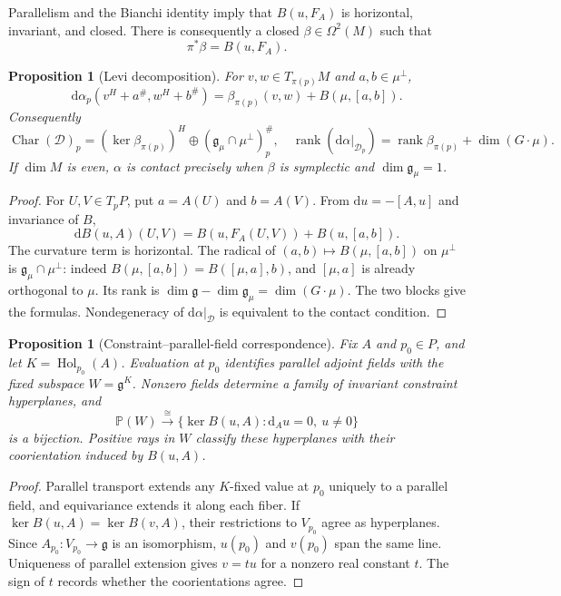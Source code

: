 \documentclass[11pt]{amsart}
\newcommand{\g}{\mathfrak g}
\newcommand{\Hol}{\operatorname{Hol}}
\newcommand{\Char}{\operatorname{Char}}
\newcommand{\rank}{\operatorname{rank}}
\newcommand{\dd}{\mathrm d}
\theoremstyle{plain}
\newtheorem{proposition}[theorem]{Proposition}
\theoremstyle{definition}
\theoremstyle{remark}
\begin{document}
Parallelism and the Bianchi identity imply that $B(u,F_A)$ is horizontal, invariant, and closed.  There is consequently a closed $\beta\in\Omega^2(M)$ such that
\begin{equation}\label{eq:beta}
 \pi^*\beta=B(u,F_A).
\end{equation}

\begin{proposition}[Levi decomposition]\label{prop:levi}
For $v,w\in T_{\pi(p)}M$ and $a,b\in\mu^\perp$,
\begin{equation}\label{eq:levi}
 \dd\alpha_p(v^H+a^\#,w^H+b^\#)
 =\beta_{\pi(p)}(v,w)+B(\mu,[a,b]).
\end{equation}
Consequently
\[
 \Char(\mathcal D)_p=(\ker\beta_{\pi(p)})^H
 \oplus(\g_\mu\cap\mu^\perp)^\#_p,
 \quad
 \rank(\dd\alpha|_{\mathcal D_p})
 =\rank\beta_{\pi(p)}+\dim(G\cdot\mu).
\]
If $\dim M$ is even, $\alpha$ is contact precisely when $\beta$ is symplectic and $\dim\g_\mu=1$.
\end{proposition}

\begin{proof}
For $U,V\in T_pP$, put $a=A(U)$ and $b=A(V)$.  From $\dd u=-[A,u]$ and invariance of $B$,
\[
 \dd B(u,A)(U,V)=B(u,F_A(U,V))+B(u,[a,b]).
\]
The curvature term is horizontal.  The radical of $(a,b)\mapsto B(\mu,[a,b])$ on $\mu^\perp$ is $\g_\mu\cap\mu^\perp$: indeed $B(\mu,[a,b])=B([\mu,a],b)$, and $[\mu,a]$ is already orthogonal to $\mu$.  Its rank is $\dim\g-\dim\g_\mu=\dim(G\cdot\mu)$.  The two blocks give the formulas.  Nondegeneracy of $\dd\alpha|_{\mathcal D}$ is equivalent to the contact condition.
\end{proof}

\begin{proposition}[Constraint--parallel-field correspondence]\label{prop:projective}
Fix $A$ and $p_0\in P$, and let $K=\Hol_{p_0}(A)$.  Evaluation at $p_0$ identifies parallel adjoint fields with the fixed subspace $W=\g^K$.  Nonzero fields determine a family of invariant constraint hyperplanes, and
\[
 \mathbb P(W)\xrightarrow{\ \cong\ }
 \{\ker B(u,A):\dd_Au=0,\ u\ne0\}
\]
is a bijection.  Positive rays in $W$ classify these hyperplanes with their coorientation induced by $B(u,A)$.
\end{proposition}

\begin{proof}
Parallel transport extends any $K$-fixed value at $p_0$ uniquely to a parallel field, and equivariance extends it along each fiber.  If $\ker B(u,A)=\ker B(v,A)$, their restrictions to $V_{p_0}$ agree as hyperplanes.  Since $A_{p_0}:V_{p_0}\to\g$ is an isomorphism, $u(p_0)$ and $v(p_0)$ span the same line.  Uniqueness of parallel extension gives $v=t u$ for a nonzero real constant $t$.  The sign of $t$ records whether the coorientations agree.
\end{proof}
\end{document}

